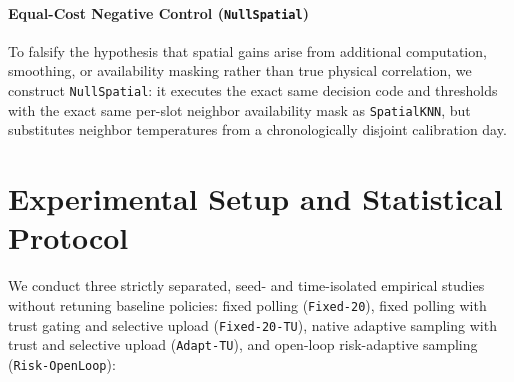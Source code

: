 \documentclass[journal,twoside,web]{ieeecolor}
\begin{document}
\paragraph{Equal-Cost Negative Control (\texttt{NullSpatial})}
To falsify the hypothesis that spatial gains arise from additional computation, smoothing, or availability masking rather than true physical correlation, we construct \texttt{NullSpatial}: it executes the exact same decision code and thresholds with the exact same per-slot neighbor availability mask as \texttt{SpatialKNN}, but substitutes neighbor temperatures from a chronologically disjoint calibration day.

\section{Experimental Setup and Statistical Protocol}

We conduct three strictly separated, seed- and time-isolated empirical studies without retuning baseline policies: fixed polling (\texttt{Fixed-20}), fixed polling with trust gating and selective upload (\texttt{Fixed-20-TU}), native adaptive sampling with trust and selective upload (\texttt{Adapt-TU}), and open-loop risk-adaptive sampling (\texttt{Risk-OpenLoop}):
\end{document}
